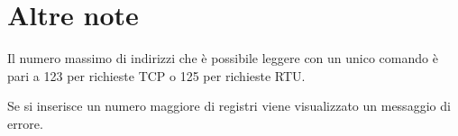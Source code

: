 
\chapter{Altre note}

Il numero massimo di indirizzi che è possibile leggere con un unico comando è pari a 123 per
richieste TCP o 125 per richieste RTU. 

Se si inserisce un numero maggiore di registri viene visualizzato un messaggio di errore.